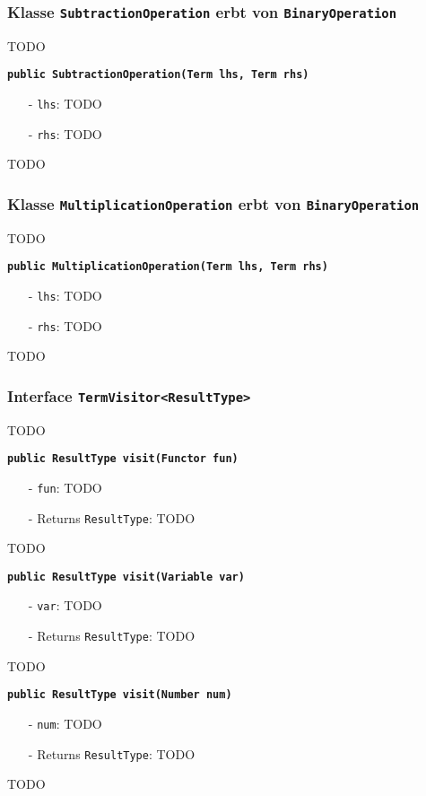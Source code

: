\documentclass[parskip=full,11pt,twoside]{scrartcl}
\begin{document}
\subsubsection{Klasse \texttt{SubtractionOperation} erbt von \texttt{BinaryOperation}}
TODO

\textbf{\texttt{public SubtractionOperation(Term lhs, Term rhs)}}
\begin{itemize}[noitemsep]
	\item[-] \texttt{lhs}: TODO
	\item[-] \texttt{rhs}: TODO
\end{itemize}
TODO

\subsubsection{Klasse \texttt{MultiplicationOperation} erbt von \texttt{BinaryOperation}}
TODO

\textbf{\texttt{public MultiplicationOperation(Term lhs, Term rhs)}}
\begin{itemize}[noitemsep]
	\item[-] \texttt{lhs}: TODO
	\item[-] \texttt{rhs}: TODO
\end{itemize}
TODO
\subsubsection{Interface \texttt{TermVisitor<ResultType>}}
TODO

\textbf{\texttt{public ResultType visit(Functor fun)}}
\begin{itemize}[noitemsep]
	\item[-] \texttt{fun}: TODO
	\item[-] Returns \texttt{ResultType}: TODO
\end{itemize}
TODO

\textbf{\texttt{public ResultType visit(Variable var)}}
\begin{itemize}[noitemsep]
	\item[-] \texttt{var}: TODO
	\item[-] Returns \texttt{ResultType}: TODO
\end{itemize}
TODO

\textbf{\texttt{public ResultType visit(Number num)}}
\begin{itemize}[noitemsep]
	\item[-] \texttt{num}: TODO
	\item[-] Returns \texttt{ResultType}: TODO
\end{itemize}
TODO
\end{document}
